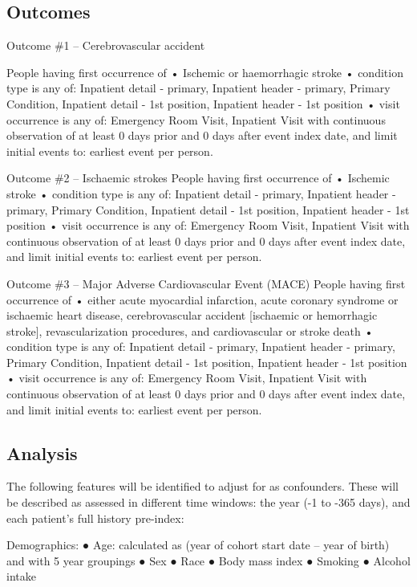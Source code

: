 \documentclass[
  12pt,
]{article}
\begin{document}
\hypertarget{outcomes}{%
\subsection{Outcomes}\label{outcomes}}

Outcome \#1 -- Cerebrovascular accident

People having first occurrence of
• Ischemic or haemorrhagic stroke
• condition type is any of: Inpatient detail - primary, Inpatient header - primary, Primary Condition, Inpatient detail - 1st position, Inpatient header - 1st position
• visit occurrence is any of: Emergency Room Visit, Inpatient Visit
with continuous observation of at least 0 days prior and 0 days after event index date, and limit initial events to: earliest event per person.

Outcome \#2 -- Ischaemic strokes
People having first occurrence of
• Ischemic stroke
• condition type is any of: Inpatient detail - primary, Inpatient header - primary, Primary Condition, Inpatient detail - 1st position, Inpatient header - 1st position
• visit occurrence is any of: Emergency Room Visit, Inpatient Visit
with continuous observation of at least 0 days prior and 0 days after event index date, and limit initial events to: earliest event per person.

Outcome \#3 -- Major Adverse Cardiovascular Event (MACE)
People having first occurrence of
• either acute myocardial infarction, acute coronary syndrome or ischaemic heart disease, cerebrovascular accident {[}ischaemic or hemorrhagic stroke{]}, revascularization procedures, and cardiovascular or stroke death
• condition type is any of: Inpatient detail - primary, Inpatient header - primary, Primary Condition, Inpatient detail - 1st position, Inpatient header - 1st position
• visit occurrence is any of: Emergency Room Visit, Inpatient Visit
with continuous observation of at least 0 days prior and 0 days after event index date, and limit initial events to: earliest event per person.

\hypertarget{analysis}{%
\subsection{Analysis}\label{analysis}}

The following features will be identified to adjust for as confounders. These will be described as assessed in different time windows: the year (-1 to -365 days), and each patient's full history pre-index:

Demographics:
● Age: calculated as (year of cohort start date -- year of birth) and with 5 year groupings
● Sex
● Race
● Body mass index
● Smoking
● Alcohol intake
\end{document}
